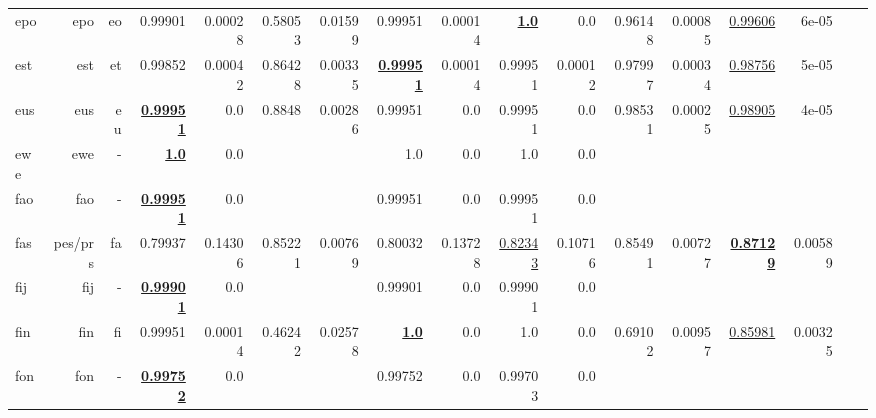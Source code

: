 \documentclass[11pt]{article}
\begin{document}
\begin{table*}[h]
{\begin{tabular}{lrrrrrrrrrrrrrrrr}
epo         & epo         & eo         & 0.99901         & 0.00028         & 0.58053         & 0.01599         & 0.99951         & 0.00014         & \textbf{\underline{1.0}}         & 0.0         & 0.96148         & 0.00085         & \underline{0.99606}         & 6e-05         \\
est         & est         & et         & 0.99852         & 0.00042         & 0.86428         & 0.00335         & \textbf{\underline{0.99951}}         & 0.00014         & 0.99951         & 0.00012         & 0.97997         & 0.00034         & \underline{0.98756}         & 5e-05         \\
eus         & eus         & eu         & \textbf{\underline{0.99951}}         & 0.0         & 0.8848         & 0.00286         & 0.99951         & 0.0         & 0.99951         & 0.0         & 0.98531         & 0.00025         & \underline{0.98905}         & 4e-05         \\
ewe         & ewe         & -         & \textbf{\underline{1.0}}         & 0.0         &          &          & 1.0         & 0.0         & 1.0         & 0.0         &          &          &          &          \\
fao         & fao         & -         & \textbf{\underline{0.99951}}         & 0.0         &          &          & 0.99951         & 0.0         & 0.99951         & 0.0         &          &          &          &          \\
fas         & pes/prs         & fa         & 0.79937         & 0.14306         & 0.85221         & 0.00769         & 0.80032         & 0.13728         & \underline{0.82343}         & 0.10716         & 0.85491         & 0.00727         & \textbf{\underline{0.87129}}         & 0.00589         \\
fij         & fij         & -         & \textbf{\underline{0.99901}}         & 0.0         &          &          & 0.99901         & 0.0         & 0.99901         & 0.0         &          &          &          &          \\
fin         & fin         & fi         & 0.99951         & 0.00014         & 0.46242         & 0.02578         & \textbf{\underline{1.0}}         & 0.0         & 1.0         & 0.0         & 0.69102         & 0.00957         & \underline{0.85981}         & 0.00325         \\
fon         & fon         & -         & \textbf{\underline{0.99752}}         & 0.0         &          &          & 0.99752         & 0.0         & 0.99703         & 0.0         &          &          &          &          \\

\end{tabular}}
\end{table*}
\end{document}
